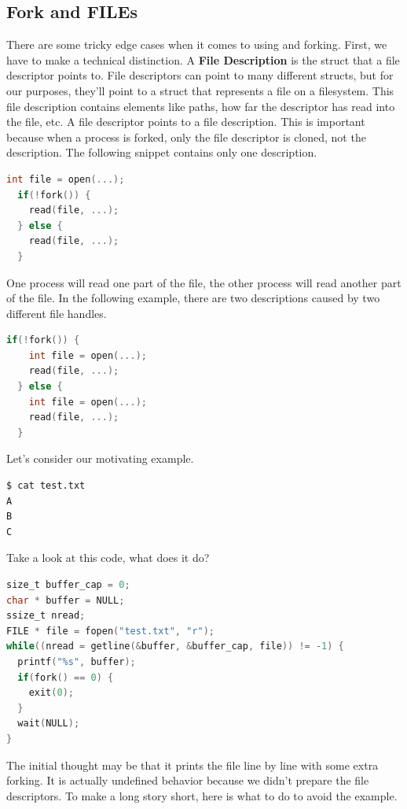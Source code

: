 \subsection{Fork and FILEs}

There are some tricky edge cases when it comes to using  and forking.
First, we have to make a technical distinction.
A \textbf{File Description} is the struct that a file descriptor points to.
File descriptors can point to many different structs, but for our purposes, they'll point to a struct that represents a file on a filesystem.
This file description contains elements like paths, how far the descriptor has read into the file, etc.
A file descriptor points to a file description.
This is important because when a process is forked, only the file descriptor is cloned, not the description.
The following snippet contains only one description.

\begin{lstlisting}[language=C]
  int file = open(...);
  if(!fork()) {
    read(file, ...);
  } else {
    read(file, ...);
  }
\end{lstlisting}

One process will read one part of the file, the other process will read another part of the file.
In the following example, there are two descriptions caused by two different file handles.

\begin{lstlisting}[language=C]
  if(!fork()) {
    int file = open(...);
    read(file, ...);
  } else {
    int file = open(...);
    read(file, ...);
  }
\end{lstlisting}

Let's consider our motivating example.

\begin{lstlisting}[language=bash]
$ cat test.txt
A
B
C
\end{lstlisting}

Take a look at this code, what does it do?

\begin{lstlisting}[language=C]
size_t buffer_cap = 0;
char * buffer = NULL;
ssize_t nread;
FILE * file = fopen("test.txt", "r");
while((nread = getline(&buffer, &buffer_cap, file)) != -1) {
  printf("%s", buffer);
  if(fork() == 0) { 
    exit(0);
  }
  wait(NULL);
}
\end{lstlisting}

The initial thought may be that it prints the file line by line with some extra forking.
It is actually undefined behavior because we didn't prepare the file descriptors.
To make a long story short, here is what to do to avoid the example.

